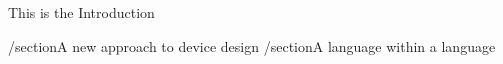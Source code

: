 This is the Introduction

/section{A new approach to device design}
/section{A language within a language}
